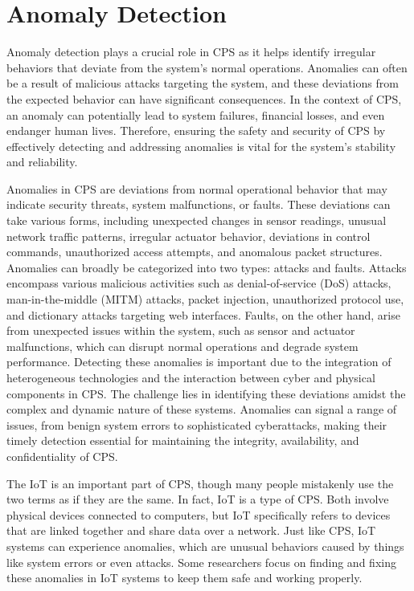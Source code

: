 \section{Anomaly Detection}\label{sec:anomaly-detection}

Anomaly detection plays a crucial role in CPS as it helps identify irregular behaviors that deviate from the system's normal operations. Anomalies can often be a result of malicious attacks targeting the system, and these deviations from the expected behavior can have significant consequences. In the context of CPS, an anomaly can potentially lead to system failures, financial losses, and even endanger human lives. Therefore, ensuring the safety and security of CPS by effectively detecting and addressing anomalies is vital for the system's stability and reliability.
\begin{definition}
Anomalies in CPS are deviations from normal operational behavior that may indicate security threats, system malfunctions, or faults. These deviations can take various forms, including unexpected changes in sensor readings, unusual network traffic patterns, irregular actuator behavior, deviations in control commands, unauthorized access attempts, and anomalous packet structures\cite{14,20}.
Anomalies can broadly be categorized into two types: attacks and faults. Attacks encompass various malicious activities such as denial-of-service (DoS) attacks, man-in-the-middle (MITM) attacks, packet injection, unauthorized protocol use, and dictionary attacks targeting web interfaces\cite{13,15}. Faults, on the other hand, arise from unexpected issues within the system, such as sensor and actuator malfunctions, which can disrupt normal operations and degrade system performance\cite{15,18}.
Detecting these anomalies is important due to the integration of heterogeneous technologies and the interaction between cyber and physical components in CPS\cite{16}. The challenge lies in identifying these deviations amidst the complex and dynamic nature of these systems. Anomalies can signal a range of issues, from benign system errors to sophisticated cyberattacks, making their timely detection essential for maintaining the integrity, availability, and confidentiality of CPS\cite{17,19}.
\end{definition}
The IoT is an important part of CPS, though many people mistakenly use the two terms as if they are the same. In fact, IoT is a type of CPS. Both involve physical devices connected to computers, but IoT specifically refers to devices that are linked together and share data over a network. Just like CPS, IoT systems can experience anomalies, which are unusual behaviors caused by things like system errors or even attacks. Some researchers focus on finding and fixing these anomalies in IoT systems to keep them safe and working properly.

